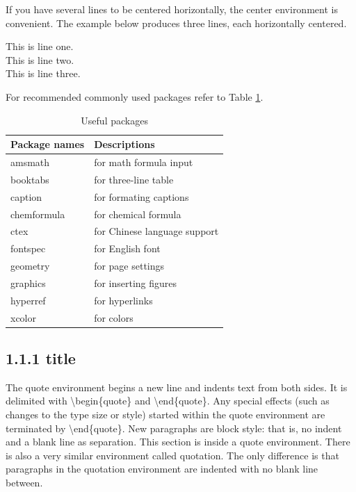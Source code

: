 \documentclass[a4paper,11pt,UTF8,openright]{book}
\begin{document}
If you have several lines to be centered horizontally, the center environment is convenient. The example below produces three lines, each horizontally centered.

\begin{center}
  This is line one. \\
  This is line two. \\
  This is line three.
\end{center}

\noindent For recommended commonly used packages refer to Table \ref{tab:useful packages}.

\begin{center}
  \begin{table}[!htbp]
    \caption{Useful packages}
    \label{tab:useful packages}
    \begin{tabular}{@{}p{}p{}@{}}
      \toprule
      \textbf{Package names} & \textbf{Descriptions}  \\ 
      \midrule
      amsmath	& for math formula input \\
      booktabs & for three-line table \\
      caption & for formating captions \\
      chemformula & for chemical formula \\
      ctex & for Chinese language support \\
      fontspec & for English font \\
      geometry & for page settings \\
      graphics & for inserting figures \\
      hyperref & for hyperlinks \\
      xcolor & for colors \\
      \bottomrule
    \end{tabular}
  \end{table}
\end{center}

\subsection{1.1.1 title}

The quote environment begins a new line and indents text from both sides. It is delimited with \textbackslash begin\{quote\} and \textbackslash end\{quote\}. Any special effects (such as changes to the type size or style) started within the quote environment
are terminated by \textbackslash end\{quote\}. New paragraphs are block style: that is, no indent and a blank line as separation. This section is inside a quote environment. There is also a very similar environment called quotation. The only difference is that paragraphs in the quotation environment are indented with no blank line between.
\end{document}
